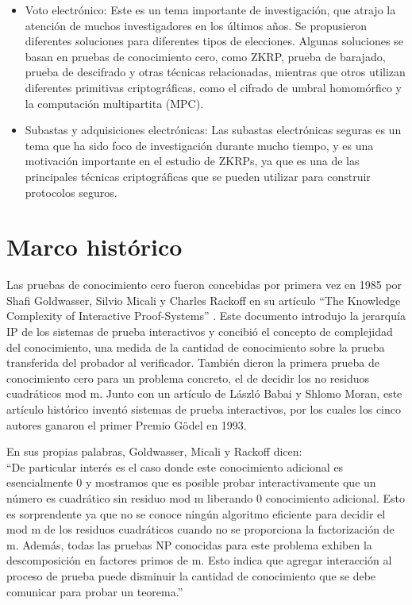 \begin{itemize}
    \item Voto electrónico: Este es un tema importante de investigación, que atrajo la atención de muchos investigadores en los últimos años. Se propusieron diferentes soluciones para diferentes tipos de elecciones. Algunas soluciones se basan en pruebas de conocimiento cero, como ZKRP, prueba de barajado, prueba de descifrado y otras técnicas relacionadas, mientras que otros utilizan diferentes primitivas criptográficas, como el cifrado de umbral homomórfico y la computación multipartita (MPC).
    
    \item Subastas y adquisiciones electrónicas: Las subastas electrónicas seguras es un tema que ha sido foco de investigación durante mucho tiempo, y es una motivación importante en el estudio de ZKRPs, ya que es una de las principales técnicas criptográficas que se pueden utilizar para construir protocolos seguros.
\end{itemize}

\section{Marco histórico}

Las pruebas de conocimiento cero fueron concebidas por primera vez en 1985 por Shafi Goldwasser, Silvio Micali y Charles Rackoff en su artículo ``The Knowledge Complexity of Interactive Proof-Systems'' \cite{Historia}. Este documento introdujo la jerarquía IP de los sistemas de prueba interactivos y concibió el concepto de complejidad del conocimiento, una medida de la cantidad de conocimiento sobre la prueba transferida del probador al verificador. También dieron la primera prueba de conocimiento cero para un problema concreto, el de decidir los no residuos cuadráticos mod m. Junto con un artículo de László Babai y Shlomo Moran, este artículo histórico inventó sistemas de prueba interactivos, por los cuales los cinco autores ganaron el primer Premio Gödel en 1993.

En sus propias palabras, Goldwasser, Micali y Rackoff dicen: \\
 ``De particular interés es el caso donde este conocimiento adicional es esencialmente 0 y mostramos que es posible probar interactivamente que un número es cuadrático sin residuo mod m liberando 0 conocimiento adicional. Esto es sorprendente ya que no se conoce ningún algoritmo eficiente para decidir el mod m de los residuos cuadráticos cuando no se proporciona la factorización de m. Además, todas las pruebas NP conocidas para este problema exhiben la descomposición en factores primos de m. Esto indica que agregar interacción al proceso de prueba puede disminuir la cantidad de conocimiento que se debe comunicar para probar un teorema.''

